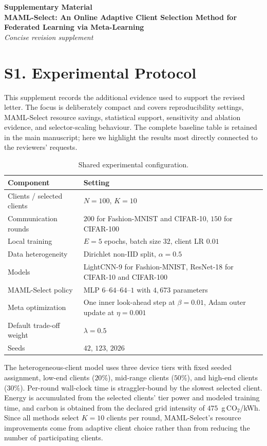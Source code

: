 \documentclass[10pt]{article}
\begin{document}
\begin{center}
{\Large \textbf{Supplementary Material}}\\[0.35em]
{\large \textbf{MAML-Select: An Online Adaptive Client Selection Method for Federated Learning via Meta-Learning}}\\[0.25em]
{\normalsize \textit{Concise revision supplement}}
\end{center}

\section*{S1. Experimental Protocol}

This supplement records the additional evidence used to support the revised letter.  The focus is deliberately compact and covers reproducibility settings, MAML-Select resource savings, statistical support, sensitivity and ablation evidence, and selector-scaling behaviour.  The complete baseline table is retained in the main manuscript; here we highlight the results most directly connected to the reviewers' requests.

\begin{table}[!ht]
\centering
\caption{Shared experimental configuration.}
\label{tab:supp_config}
\small
\begin{tabular}{@{}ll@{}}
\toprule
Component & Setting \\
\midrule
Clients / selected clients & $N=100$, $K=10$ \\
Communication rounds & $200$ for Fashion-MNIST and CIFAR-10, $150$ for CIFAR-100 \\
Local training & $E=5$ epochs, batch size $32$, client LR $0.01$ \\
Data heterogeneity & Dirichlet non-IID split, $\alpha=0.5$ \\
Models & LightCNN-9 for Fashion-MNIST, ResNet-18 for CIFAR-10 and CIFAR-100 \\
MAML-Select policy & MLP $6$--$64$--$64$--$1$ with $4{,}673$ parameters \\
Meta optimization & One inner look-ahead step at $\beta=0.01$, Adam outer update at $\eta=0.001$ \\
Default trade-off weight & $\lambda=0.5$ \\
Seeds & $42$, $123$, $2026$ \\
\bottomrule
\end{tabular}
\end{table}

The heterogeneous-client model uses three device tiers with fixed seeded assignment, low-end clients ($20\%$), mid-range clients ($50\%$), and high-end clients ($30\%$).  Per-round wall-clock time is straggler-bound by the slowest selected client.  Energy is accumulated from the selected clients' tier power and modeled training time, and carbon is obtained from the declared grid intensity of $475$~g\,CO$_2$/kWh.  Since all methods select $K=10$ clients per round, MAML-Select's resource improvements come from adaptive client choice rather than from reducing the number of participating clients.
\end{document}

